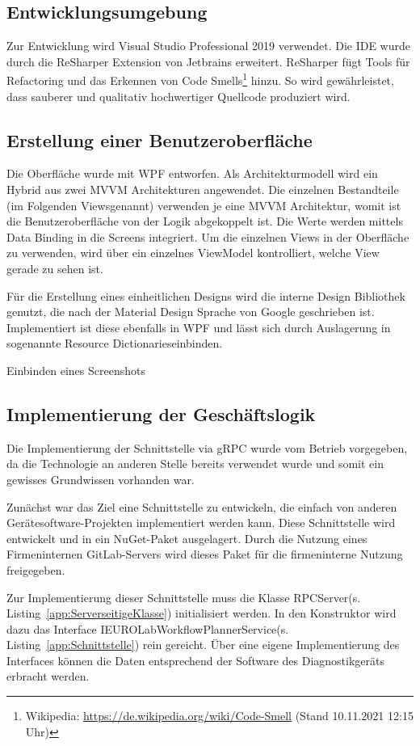 \subsection{Entwicklungsumgebung}
\label{sec:Entwicklungsumgebung}
Zur Entwicklung wird Visual Studio Professional 2019 verwendet. Die IDE wurde durch die ReSharper Extension von Jetbrains erweitert. ReSharper fügt Tools für Refactoring und das Erkennen von Code Smells\footnote{Wikipedia: \url{https://de.wikipedia.org/wiki/Code-Smell} (Stand 10.11.2021 12:15 Uhr)} hinzu. So wird gewährleistet, dass sauberer und qualitativ hochwertiger Quellcode produziert wird.

\subsection{Erstellung einer Benutzeroberfläche}
\label{sec:ErstellungEinerBenutzeroberfläche}
Die Oberfläche wurde mit {\acs{WPF}} entworfen. Als Architekturmodell wird ein Hybrid aus zwei {\acs{MVVM}} Architekturen angewendet. Die einzelnen Bestandteile (im Folgenden \glqq Views\grqq \space genannt) verwenden je eine {\acs{MVVM}} Architektur, womit ist die Benutzeroberfläche von der Logik abgekoppelt ist. Die Werte werden mittels Data Binding in die Screens integriert. Um die einzelnen Views in der Oberfläche zu verwenden, wird über ein einzelnes ViewModel kontrolliert, welche View gerade zu sehen ist.

Für die Erstellung eines einheitlichen Designs wird die {\betriebNameKzf} interne Design Bibliothek genutzt, die nach der Material Design Sprache von Google geschrieben ist. Implementiert ist diese ebenfalls in {\acs{WPF}} und lässt sich durch Auslagerung in sogenannte \glqq Resource Dictionaries\grqq \space einbinden.

Einbinden eines Screenshots

\subsection{Implementierung der Geschäftslogik}
\label{sec:ImplementierungDerGeschäftslogik}
Die Implementierung der Schnittstelle via {\acs{gRPC}} wurde vom Betrieb vorgegeben, da die Technologie an anderen Stelle bereits verwendet wurde und somit ein gewisses Grundwissen vorhanden war.

Zunächst war das Ziel eine Schnittstelle zu entwickeln, die einfach von anderen Gerätesoftware-Projekten implementiert werden kann. Diese Schnittstelle wird entwickelt und in ein {\acs{NuGet}}-Paket ausgelagert. Durch die Nutzung eines Firmeninternen {\acs{GitLab}}-Servers wird dieses Paket für die firmeninterne Nutzung freigegeben.

Zur Implementierung dieser Schnittstelle muss die Klasse \glqq RPCServer\grqq \space (s. Listing~\ref{app:ServerseitigeKlasse}) initialisiert werden. In den Konstruktor wird dazu das Interface \glqq IEUROLabWorkflowPlannerService\grqq \space (s. Listing~\ref{app:Schnittstelle}) rein gereicht. Über eine eigene Implementierung des Interfaces können die Daten entsprechend der Software des Diagnostikgeräts erbracht werden.